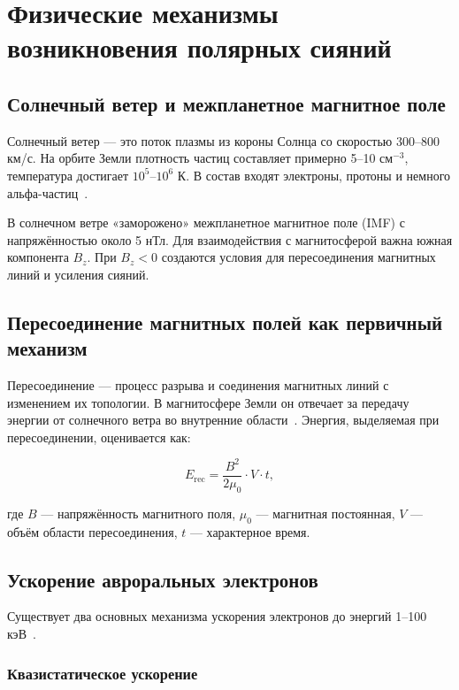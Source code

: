 \section{Физические механизмы возникновения полярных сияний}

\subsection{Солнечный ветер и межпланетное магнитное поле}

Солнечный ветер --- это поток плазмы из короны Солнца со скоростью 300--800 км/с. На орбите Земли плотность частиц составляет примерно 5--10 см$^{-3}$, температура достигает $10^5$--$10^6$ К. В состав входят электроны, протоны и немного альфа-частиц~\cite{kivelson1995}.

В солнечном ветре «заморожено» межпланетное магнитное поле (IMF) с напряжённостью около 5 нТл. Для взаимодействия с магнитосферой важна южная компонента $B_z$. При $B_z < 0$ создаются условия для пересоединения магнитных линий и усиления сияний.

\subsection{Пересоединение магнитных полей как первичный механизм}

Пересоединение --- процесс разрыва и соединения магнитных линий с изменением их топологии. В магнитосфере Земли он отвечает за передачу энергии от солнечного ветра во внутренние области~\cite{dungey1961}. Энергия, выделяемая при пересоединении, оценивается как:

\begin{equation}
    E_{\text{rec}} = \frac{B^2}{2\mu_0} \cdot V \cdot t,
    \label{eq:energy}
\end{equation}

где $B$ --- напряжённость магнитного поля, $\mu_0$ --- магнитная постоянная, $V$ --- объём области пересоединения, $t$ --- характерное время.

\subsection{Ускорение авроральных электронов}

Существует два основных механизма ускорения электронов до энергий 1--100 кэВ~\cite{lyons1984}.

\subsubsection{Квазистатическое ускорение}

